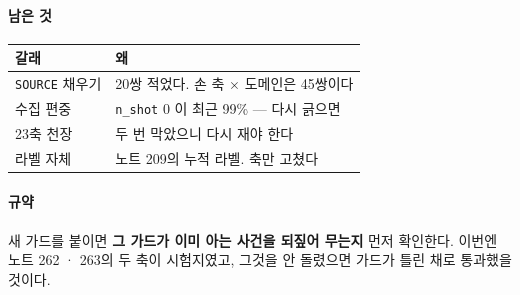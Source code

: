 \documentclass[10pt]{article}
\begin{document}
\paragraph{남은 것}
\begin{center}\small
\begin{tabular}{ll}
\hline
갈래 & 왜 \\
\hline
\texttt{SOURCE} 채우기 & 20쌍 적었다. 손 축 $\times$ 도메인은 45쌍이다 \\
수집 편중 & \texttt{n\_shot} 0 이 최근 99\% --- 다시 긁으면 \\
23축 천장 & 두 번 막았으니 다시 재야 한다 \\
라벨 자체 & 노트 209의 누적 라벨. 축만 고쳤다 \\
\hline
\end{tabular}
\end{center}

\paragraph{규약} 새 가드를 붙이면 \textbf{그 가드가 이미 아는 사건을 되짚어
무는지} 먼저 확인한다. 이번엔 노트 262 · 263의 두 축이 시험지였고, 그것을
안 돌렸으면 가드가 틀린 채로 통과했을 것이다.
\end{document}
